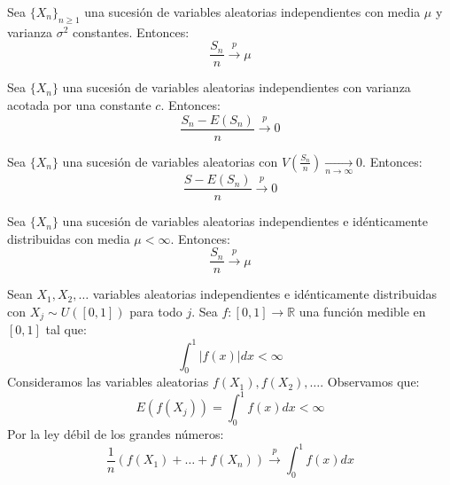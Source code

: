 \begin{theorem}[Chebyshev]
    Sea $\{X_n\}_{n \geq 1}$ una sucesión de variables aleatorias independientes con media $\mu$ y varianza $\sigma^2$ constantes.
    Entonces:
    $$\frac{S_n}{n} \xrightarrow{p} \mu$$
\end{theorem}

\begin{theorem}[Chebyshev]
    Sea $\{X_n\}$ una sucesión de variables aleatorias independientes con varianza acotada por una constante $c$.
    Entonces:
    $$\frac{S_n - E(S_n)}{n} \xrightarrow{p} 0$$
\end{theorem}

\begin{theorem}[Márkov]
    Sea $\{X_n\}$ una sucesión de variables aleatorias con $V\left(\frac{S_n}{n}\right) \xrightarrow[n \to \infty]{} 0$.
    Entonces:
    $$\frac{S - E(S_n)}{n} \xrightarrow{p} 0$$
\end{theorem}

\begin{theorem}[Khinchin]
    Sea $\{X_n\}$ una sucesión de variables aleatorias independientes e idénticamente distribuidas con media $\mu < \infty$.
    Entonces:
    $$\frac{S_n}{n} \xrightarrow{p} \mu$$
\end{theorem}

\begin{example}
    Sean $X_1, X_2, \dots$ variables aleatorias independientes e idénticamente distribuidas con $X_j \sim U([0, 1])$ para todo $j$.
    Sea $f: [0, 1] \to \mathbb{R}$ una función medible en $[0, 1]$ tal que:
    $$\int_0^1 |f(x)|dx < \infty$$
    Consideramos las variables aleatorias $f(X_1), f(X_2), \dots$.
    Observamos que:
    $$E(f(X_j)) = \int_0^1 f(x)dx < \infty$$
    Por la ley débil de los grandes números:
    $$\frac{1}{n}(f(X_1) + \dots + f(X_n)) \xrightarrow{p} \int_0^1 f(x)dx$$
\end{example}

